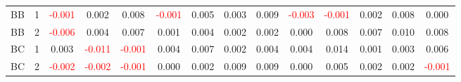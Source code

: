 \begin{table}[!htb]
{\begin{tabular}{llcccccccccccc}
BB & 1 & \textcolor{red}{-0.001} & 0.002 & 0.008 & \textcolor{red}{-0.001} & 0.005 & 0.003 & 0.009 & \textcolor{red}{-0.003} & \textcolor{red}{-0.001} & 0.002 & 0.008 & 0.000\\
BB & 2 & \textcolor{red}{-0.006} & 0.004 & 0.007 & 0.001 & 0.004 & 0.002 & 0.002 & 0.000 & 0.008 & 0.007 & 0.010 & 0.008\\
BC & 1 & 0.003 & \textcolor{red}{-0.011} & \textcolor{red}{-0.001} & 0.004 & 0.007 & 0.002 & 0.004 & 0.004 & 0.014 & 0.001 & 0.003 & 0.006\\
BC & 2 & \textcolor{red}{-0.002} & \textcolor{red}{-0.002} & \textcolor{red}{-0.001} & 0.000 & 0.002 & 0.009 & 0.009 & 0.000 & 0.005 & 0.002 & 0.002 & \textcolor{red}{-0.001}\\
\hline
    \end{tabular}%
    }
\end{table}

